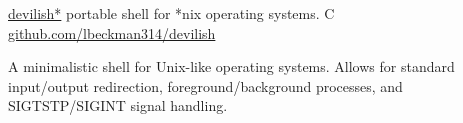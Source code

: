 \showoff
{\href{https://liambeckman.com/code/devilish}{devilish*}}
{portable shell for *nix operating systems.}
{C}
{\href{https://github.com/lbeckman314/devilish}{github.com/lbeckman314/devilish}}

A minimalistic shell for Unix-like operating systems. Allows for standard input/output redirection, foreground/background processes, and SIGTSTP/SIGINT signal handling.

\myBreak
